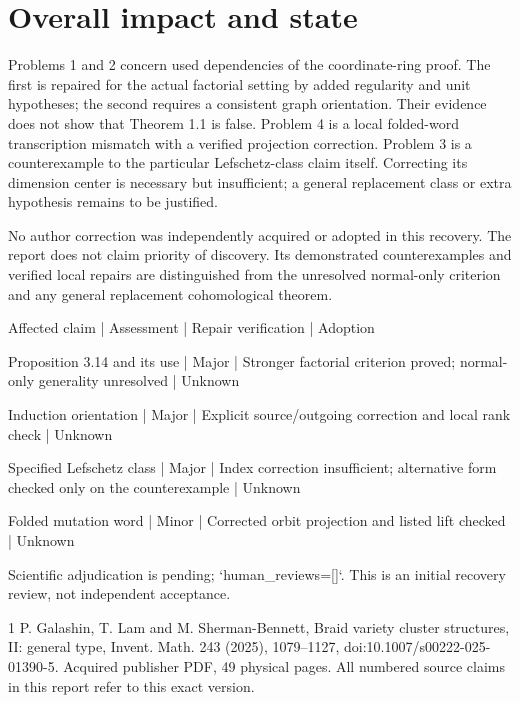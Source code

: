 \documentclass[10pt]{article}
\begin{document}
\section*{Overall impact and state}
Problems 1 and 2 concern used dependencies of the coordinate-ring proof. The first is repaired for the actual factorial setting by added regularity and unit hypotheses; the second requires a consistent graph orientation. Their evidence does not show that Theorem 1.1 is false. Problem 4 is a local folded-word transcription mismatch with a verified projection correction. Problem 3 is a counterexample to the particular Lefschetz-class claim itself. Correcting its dimension center is necessary but insufficient; a general replacement class or extra hypothesis remains to be justified.\par
No author correction was independently acquired or adopted in this recovery. The report does not claim priority of discovery. Its demonstrated counterexamples and verified local repairs are distinguished from the unresolved normal-only criterion and any general replacement cohomological theorem.\par
Affected claim | Assessment | Repair verification | Adoption\par
Proposition 3.14 and its use | Major | Stronger factorial criterion proved; normal-only generality unresolved | Unknown\par
Induction orientation | Major | Explicit source/outgoing correction and local rank check | Unknown\par
Specified Lefschetz class | Major | Index correction insufficient; alternative form checked only on the counterexample | Unknown\par
Folded mutation word | Minor | Corrected orbit projection and listed lift checked | Unknown\par
Scientific adjudication is pending; `human\_reviews=[]`. This is an initial recovery review, not independent acceptance.\par
1 P. Galashin, T. Lam and M. Sherman-Bennett, Braid variety cluster structures, II: general type, Invent. Math. 243 (2025), 1079–1127, doi:10.1007/s00222-025-01390-5. Acquired publisher PDF, 49 physical pages. All numbered source claims in this report refer to this exact version.\par
\end{document}
